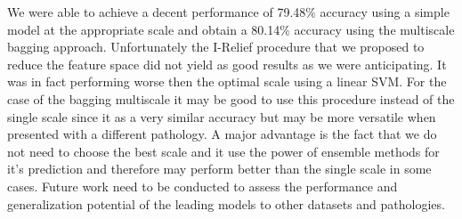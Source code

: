 \documentclass[12pt,journal,compsoc]{IEEEtran}
\begin{document}
We were able to achieve a decent performance of 79.48\% accuracy using a simple model at the appropriate scale and obtain a 80.14\% accuracy using the multiscale bagging approach. Unfortunately the I-Relief procedure that we proposed to reduce the feature space did not yield as good results as we were anticipating. It was in fact performing worse then the optimal scale using a linear SVM. For the case of the bagging multiscale it may be good to use this procedure instead of the single scale since it as a very similar accuracy but may be more versatile when presented with a different pathology. A major advantage is the fact that we do not need to choose the best scale and it use the power of ensemble methods for it's prediction and therefore may perform better than the single scale in some cases. Future work need to be conducted to assess the performance and generalization potential of the leading models to other datasets and pathologies.

%




\end{document}
